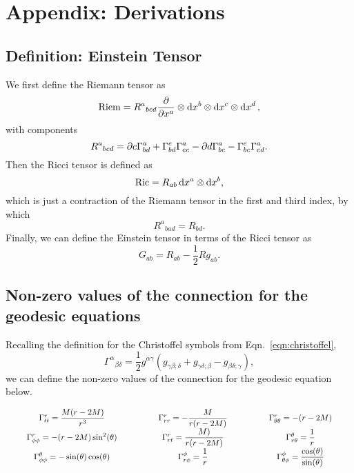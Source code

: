 \onecolumn
\section{Appendix: Derivations}
\subsection{Definition: Einstein Tensor}
\label{apx:einsteintensor}
We first define the Riemann tensor as
\begin{equation}
\text{Riem}=R^a{}_{bcd}\pdv{}{x^a}\otimes\odif{x^b}\otimes\dd{x^c}\otimes\dd{x^d},
\end{equation}
with components
\begin{equation}
R^a{}_{bcd}=\pdif*{c}\Gamma^a_{bd}+\Gamma^e_{bd}\Gamma^a_{ec}-\pdif*{d}\Gamma^a_{bc}-\Gamma^e_{bc}\Gamma^a_{ed}.
\end{equation}
Then the Ricci tensor is defined as
\begin{equation}
\text{Ric}=R_{ab}\odif{x^a}\otimes\odif{x^b},
\end{equation}
which is just a contraction of the Riemann tensor in the first and third index, by which
\begin{equation}
R^a{}_{bad}=R_{bd}.
\end{equation}
Finally, we can define the Einstein tensor in terms of the Ricci tensor as
\begin{equation}
G_{ab}=R_{ab}-\frac{1}{2}Rg_{ab}.
\end{equation}

\subsection{Non-zero values of the connection for the geodesic equations}
\label{apx:connectvalues}
Recalling the definition for the Christoffel symbols from Eqn.~\eqref{eqn:christoffel},
\begin{equation}
\Gamma^\alpha{}_{\beta\delta}=\frac{1}{2}g^{\alpha \gamma}(g_{\gamma\beta;\delta}+g_{\gamma\delta;\beta}-g_{\beta\delta;\gamma}),
\end{equation}
we can define the non-zero values of the connection for the geodesic equation below.

$$\arraycolsep=25pt
\begin{array}{ccc}
\Gamma^r_{tt}=\dfrac{M(r-2M)}{r^3} & \Gamma^r_{rr}=-\dfrac{M}{r(r-2M)} & \Gamma^r_{\theta\theta}=-(r-2M)\\
\Gamma^r_{\phi\phi}=-(r-2M)\sin^2(\theta) & \Gamma^r_{rt}=\dfrac{M)}{r(r-2M)} & \Gamma^\theta_{r\theta}=\dfrac{1}{r}\\
\Gamma^\theta_{\phi\phi}=-\sin(\theta)\cos(\theta) & \Gamma^\phi_{r\phi}=\dfrac{1}{r} & \Gamma^\phi_{\theta\phi}=\dfrac{\cos(\theta)}{\sin(\theta)}
\end{array}$$

